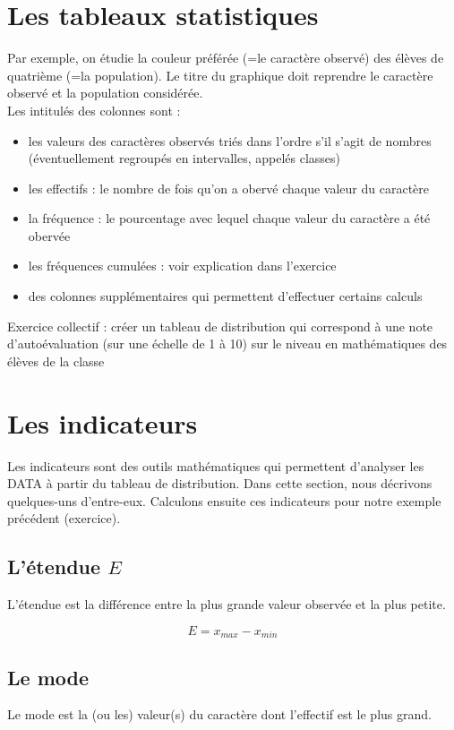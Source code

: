 \documentclass[utf8, a4paper, 12 pt]{article}
\begin{document}
    \section{Les tableaux statistiques}
    Par exemple, on étudie la couleur préférée (=le caractère observé) des élèves de quatrième (=la population).
    Le titre du graphique doit reprendre le caractère observé et la population considérée.\\
    Les intitulés des colonnes sont : \begin{itemize}
        \item les valeurs des caractères observés triés dans l'ordre s'il s'agit de 
        nombres (éventuellement regroupés en intervalles, appelés classes)
        \item les effectifs : le nombre de fois qu'on a obervé chaque valeur du caractère
        \item la fréquence : le pourcentage avec lequel chaque valeur du caractère a été obervée
        \item les fréquences cumulées : voir explication dans l'exercice
        \item des colonnes supplémentaires qui permettent d'effectuer certains calculs 
    \end{itemize} \vspace{1\baselineskip}
    Exercice collectif : créer un tableau de distribution 
    qui correspond à une note d'autoévaluation (sur une échelle de 1 à 10) 
    sur le niveau en mathématiques des élèves de la classe

    \section{Les indicateurs}
    Les indicateurs sont des outils mathématiques qui permettent d'analyser 
    les DATA à partir du tableau de distribution. 
    Dans cette section, nous décrivons quelques-uns d'entre-eux.
    Calculons ensuite ces indicateurs pour notre exemple précédent (exercice).

    \subsection{L'étendue \(E\)}
    L'étendue est la différence entre la plus grande valeur observée et la plus petite.

    \[E = x_{max} - x_{min}\]

    \subsection{Le mode}
    Le mode est la (ou les) valeur(s) du caractère dont l'effectif est le plus grand.
\end{document}
